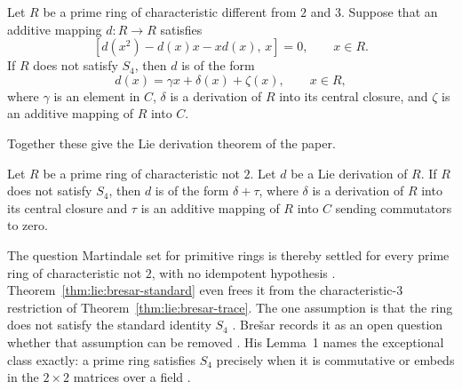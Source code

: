 \begin{theorem}\label{thm:lie:bresar-trace}
Let $R$ be a prime ring of characteristic different from $2$ and $3$. Suppose that
an additive mapping $d\colon R\to R$ satisfies
\[
[d(x^{2})-d(x)x-xd(x),\,x]=0,\qquad x\in R.
\]
If $R$ does not satisfy $S_{4}$, then $d$ is of the form
\[
d(x)=\gamma x+\delta(x)+\zeta(x),\qquad x\in R,
\]
where $\gamma$ is an element in $C$, $\delta$ is a derivation of $R$ into its
central closure, and $\zeta$ is an additive mapping of $R$ into $C$.
\end{theorem}

Together these give the Lie derivation theorem of the paper.

\begin{theorem}\label{thm:lie:bresar-standard}
Let $R$ be a prime ring of characteristic not $2$. Let $d$ be a Lie derivation of
$R$. If $R$ does not satisfy $S_{4}$, then $d$ is of the form $\delta+\tau$, where
$\delta$ is a derivation of $R$ into its central closure and $\tau$ is an additive
mapping of $R$ into $C$ sending commutators to zero.
\end{theorem}

The question Martindale set for primitive rings is thereby settled for every
prime ring of characteristic not $2$, with no idempotent hypothesis
\cite[Theorem~5, p.~529]{Bresar1993LieTAMS}.
Theorem~\ref{thm:lie:bresar-standard} even frees it from the
characteristic-$3$ restriction of Theorem~\ref{thm:lie:bresar-trace}. The one
assumption is that the ring does not satisfy the standard identity $S_{4}$
\cite[Theorem~5, p.~529]{Bresar1993LieTAMS}.
Brešar records it as an open
question whether that assumption can be removed
\cite[p.~528]{Bresar1993LieTAMS}. His Lemma~1 names the exceptional class
exactly: a prime ring satisfies $S_{4}$ precisely when it is commutative or
embeds in the $2\times2$ matrices over a field \cite[Lemma~1,
p.~530]{Bresar1993LieTAMS}.
